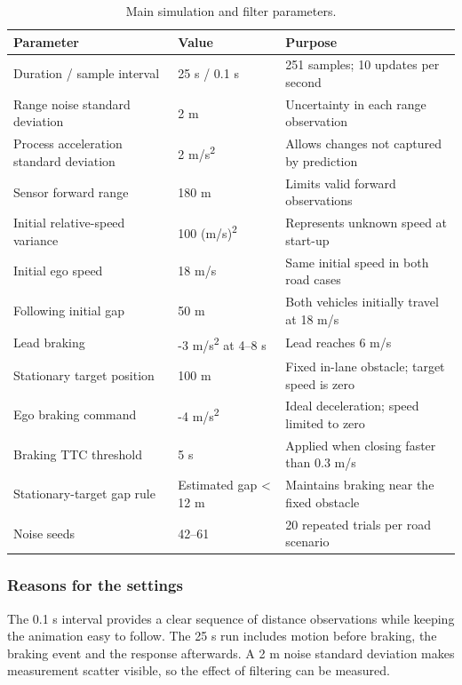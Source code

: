 \documentclass[11pt,a4paper]{article}
\begin{document}
\begin{table}[H]\centering\caption{Main simulation and filter parameters.}\small\renewcommand{\arraystretch}{1.2}\begin{tabularx}{\linewidth}{YYY}\toprule
\textbf{Parameter} & \textbf{Value} & \textbf{Purpose} \\
\midrule
Duration / sample interval & 25 s / 0.1 s & 251 samples; 10 updates per second \\
Range noise standard deviation & 2 m & Uncertainty in each range observation \\
Process acceleration standard deviation & 2 m/s\textsuperscript{2} & Allows changes not captured by prediction \\
Sensor forward range & 180 m & Limits valid forward observations \\
Initial relative-speed variance & 100 (m/s)\textsuperscript{2} & Represents unknown speed at start-up \\
Initial ego speed & 18 m/s & Same initial speed in both road cases \\
Following initial gap & 50 m & Both vehicles initially travel at 18 m/s \\
Lead braking & -3 m/s\textsuperscript{2} at 4--8 s & Lead reaches 6 m/s \\
Stationary target position & 100 m & Fixed in-lane obstacle; target speed is zero \\
Ego braking command & -4 m/s\textsuperscript{2} & Ideal deceleration; speed limited to zero \\
Braking TTC threshold & 5 s & Applied when closing faster than 0.3 m/s \\
Stationary-target gap rule & Estimated gap < 12 m & Maintains braking near the fixed obstacle \\
Noise seeds & 42--61 & 20 repeated trials per road scenario \\
\bottomrule\end{tabularx}\end{table}
\subsubsection{Reasons for the settings}
The 0.1 s interval provides a clear sequence of distance observations while keeping the animation easy to follow. The 25 s run includes motion before braking, the braking event and the response afterwards. A 2 m noise standard deviation makes measurement scatter visible, so the effect of filtering can be measured.\par
\end{document}
